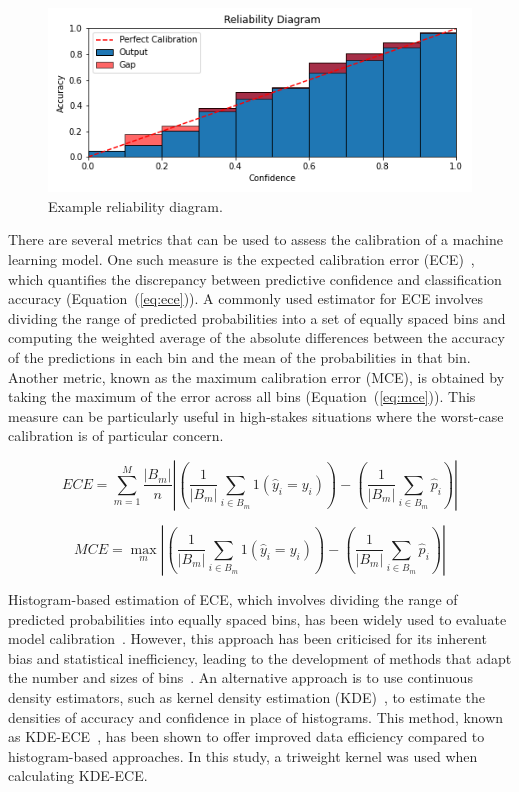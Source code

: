 \begin{figure}[h]
	\centering
	\includegraphics[width=\textwidth]{images/reliability_diagram.png}
	\caption{Example reliability diagram.}
	\label{fig:reliability_diagram}
\end{figure}

There are several metrics that can be used to assess the calibration of a machine learning model. One such measure is the expected calibration error (ECE)~\citep{guo2017calibration}, which quantifies the discrepancy between predictive confidence and classification accuracy (Equation~(\ref{eq:ece})). A commonly used estimator for ECE involves dividing the range of predicted probabilities into a set of equally spaced bins and computing the weighted average of the absolute differences between the accuracy of the predictions in each bin and the mean of the probabilities in that bin. Another metric, known as the maximum calibration error (MCE), is obtained by taking the maximum of the error across all bins (Equation~(\ref{eq:mce})). This measure can be particularly useful in high-stakes situations where the worst-case calibration is of particular concern.

\begin{equation}
	ECE=\sum_{m=1}^{M}\frac{\left|B_m\right|}{n}\left|\left(\frac{1}{\left|B_m\right|}\sum_{i\in B_m}1(\hat{y}_i=y_i)\right)-\left(\frac{1}{\left|B_m\right|}\sum_{i\in B_m}\hat{p}_i\right)\right|
	\label{eq:ece}
\end{equation}

\begin{equation}
	MCE = \max_m\left|\left(\frac{1}{\left|B_m\right|}\sum_{i\in B_m}1(\hat{y}_i=y_i)\right)-\left(\frac{1}{\left|B_m\right|}\sum_{i\in B_m}\hat{p}_i\right)\right|
	\label{eq:mce}
\end{equation}

Histogram-based estimation of ECE, which involves dividing the range of predicted probabilities into equally spaced bins, has been widely used to evaluate model calibration~\citep{muller2019does}. However, this approach has been criticised for its inherent bias and statistical inefficiency, leading to the development of methods that adapt the number and sizes of bins~\citep{roelofs2022mitigating}. An alternative approach is to use continuous density estimators, such as kernel density estimation (KDE)~\citep{parzen1962estimation}, to estimate the densities of accuracy and confidence in place of histograms. This method, known as KDE-ECE~\citep{zhang2020mix}, has been shown to offer improved data efficiency compared to histogram-based approaches. In this study, a triweight kernel was used when calculating KDE-ECE.


